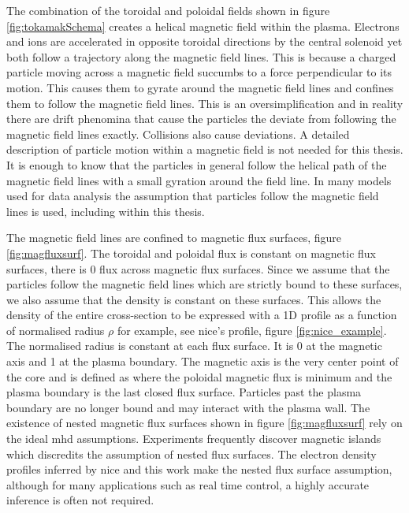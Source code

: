 The combination of the toroidal and poloidal fields shown in figure \ref{fig:tokamakSchema} creates a helical magnetic field within the plasma. Electrons and ions are accelerated in opposite toroidal directions by the central solenoid yet both follow a trajectory along the magnetic field lines. This is because a charged particle moving across a magnetic field succumbs to a force perpendicular to its motion. This causes them to gyrate around the magnetic field lines and confines them to follow the magnetic field lines. This is an oversimplification and in reality there are drift phenomina that cause the particles the deviate from following the magnetic field lines exactly. Collisions also cause deviations. A detailed description of particle motion within a magnetic field is not needed for this thesis. It is enough to know that the particles in general follow the helical path of the magnetic field lines with a small gyration around the field line. In many models used for data analysis the assumption that particles follow the magnetic field lines is used, including within this thesis. 

The magnetic field lines are confined to magnetic flux surfaces, figure \ref{fig:magfluxsurf}. The toroidal and poloidal flux is constant on magnetic flux surfaces, there is 0 flux across magnetic flux surfaces. Since we assume that the particles follow the magnetic field lines which are strictly bound to these surfaces, we also assume that the density is constant on these surfaces. This allows the density of the entire cross-section to be expressed with a 1D profile as a function of normalised radius $\rho$ for example, see \gls{nice}'s profile, figure \ref{fig:nice_example}. The normalised radius is constant at each flux surface. It is 0 at the magnetic axis and 1 at the plasma boundary. The magnetic axis is the very center point of the core and is defined as where the poloidal magnetic flux is minimum and the plasma boundary is the last closed flux surface. Particles past the plasma boundary are no longer bound and may interact with the plasma wall. The existence of nested magnetic flux surfaces shown in figure \ref{fig:magfluxsurf} rely on the ideal \gls{mhd} assumptions. Experiments frequently discover magnetic islands which discredits the assumption of nested flux surfaces. The electron density profiles inferred by \gls{nice} and this work make the nested flux surface assumption, although for many applications such as real time control, a highly accurate inference is often not required.

